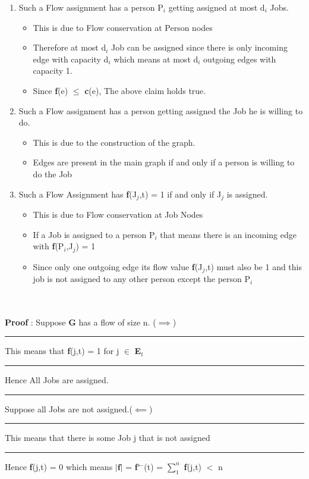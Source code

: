 \documentclass{report}
\begin{document}
 \begin{enumerate}
     \item Such a Flow assignment has a person P$_i$ getting assigned at most d$_i$ Jobs.
     \begin{itemize}
         \item This is due to Flow conservation at Person nodes
         \item Therefore at most d$_i$ Job can be assigned since there is only incoming edge with capacity d$_i$ which means at most d$_i$ outgoing edges with capacity 1.
         \item Since \textbf{f}(e) $\leq$ \textbf{c}(e), The above claim holds true.
     \end{itemize}
     \item Such a Flow assignment has a person getting assigned the Job he is willing to do.
     \begin{itemize}
         \item This is due to the construction of the graph.
         \item Edges are present in the main graph if and only if a person is willing to do the Job
     \end{itemize}
     \item Such a Flow Assignment has \textbf{f}(J$_j$,t) = 1 if and only if J$_j$ is assigned.
     \begin{itemize}
         \item This is due to Flow conservation at Job Nodes
         \item If a Job is assigned to a person P$_i$ that means there is an incoming edge with \textbf{f}(P$_i$,J$_j$) = 1
         \item Since only one outgoing edge its flow value \textbf{f}(J$_j$,t) must also be 1 and this job is not assigned to any other person except the person P$_i$
     \end{itemize}
 \end{enumerate}
   \\
    \vspace*{0em}\\
 \textbf{Proof} : Suppose \textbf{G} has a flow of size n. ($\implies$)\vspace{0.5em}\\
 \rule[0.5mm]{1.1cm}{0pt} This means that \textbf{f}(j,t) = 1 for j $\in$ \textbf{E}$_t$\\
 \rule[0.5cm]{1.1cm}{0pt} Hence All Jobs are assigned.\\
 \rule[0.5cm]{1.1cm}{0pt} Suppose all Jobs are not assigned.($\impliedby$)\\
 \rule[0.5cm]{1.1cm}{0pt} This means that there is some Job j that is not assigned\\
 \rule[0.5cm]{1.1cm}{0pt} Hence \textbf{f}(j,t) = 0  which means $|\mathbf{f}|$ = \textbf{f}$^\gets$(t) = $\sum_1^n$ \textbf{f}(j,t) $<$ n\\
\end{document}
